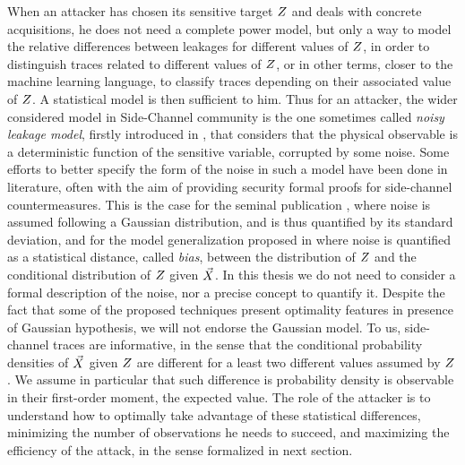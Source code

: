 When an attacker has chosen its sensitive target $Z$ and deals with concrete acquisitions, he does not need a complete power model, but only  a way to model the relative differences between leakages for different values of $Z$, in order to distinguish traces related to different values of $Z$, or in other terms, closer to the machine learning language, to classify traces depending on their associated value of $Z$. A statistical model is then sufficient to him. Thus for an attacker, the wider considered model in Side-Channel community is the one sometimes called \emph{noisy leakage model}, firstly introduced in \cite{chari1999towards}, that considers that the physical observable is a deterministic function of the sensitive variable, corrupted by some noise. Some efforts to better specify the form of the noise in such a model have been done in literature, often with the aim of providing security formal proofs for side-channel countermeasures. This is the case for the seminal publication \cite{chari1999towards}, where noise is assumed following a Gaussian distribution, and is thus quantified by its standard deviation, and for the model generalization proposed in \cite{prouff2013masking} where noise is quantified as a statistical distance, called \emph{bias}, between the distribution of $Z$ and the conditional distribution of $Z$ given $\vec{X}$. In this thesis we do not need to consider a formal description of the noise, nor a precise concept to quantify it. Despite the fact that some of the proposed techniques present optimality features in presence of Gaussian hypothesis, we will not endorse the Gaussian model. To us, side-channel traces are informative, in the sense that the conditional probability densities of $\vec{X}$ given $Z$ are different for a least two different values assumed by $Z$. We assume in particular that such difference is probability density is observable in their first-order moment, \ie the expected value. The role of the attacker is to understand how to optimally take advantage of these statistical differences, minimizing the number of observations he needs to succeed, and maximizing the efficiency of the attack, in the sense formalized in next section. 



